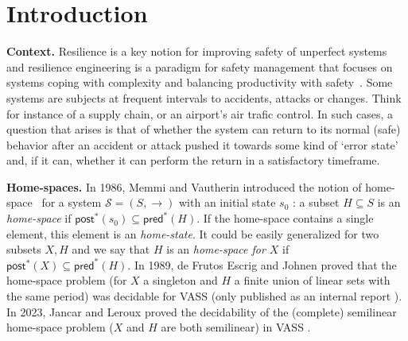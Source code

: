\documentclass[runningheads]{llncs}
\newcommand{\pred}{\textsf{pred}}
\newcommand{\post}{\textsf{post}}
\begin{document}
\newcommand{\LCM}{\mathsf{LCM}}
\newcommand{\LOGSPACE}{\mathsf{LOGSPACE}}
\newcommand{\MSO}{\mathsf{MSO}}
\newcommand{\SO}{\mathsf{SO}}

 \newcommand{\N}{\mathds{N}}



\section{Introduction}\label{section introduction}


{\bf Context.} 
Resilience is a key notion for improving safety of unperfect systems and resilience engineering is a paradigm for safety management that focuses on systems coping with complexity and balancing productivity with safety~\cite{challenges}. Some systems are subjects at frequent intervals to accidents, attacks or changes. Think for instance of a supply chain, or an airport’s air trafic control. In such cases, a question that arises is that of whether the system can return to its normal (safe) behavior after an accident or attack
pushed it towards some kind of ‘error state’ and, if it can, whether it can perform the return in a satisfactory timeframe. 


{\bf Home-spaces.}
 In 1986, Memmi and Vautherin introduced the notion of home-space~\cite{DBLP:conf/ac/MemmiV86} for a system $\mathscr{S} = (S,\rightarrow )$ with an initial state $s_0$ : a subset $H \subseteq S$ is an \emph{home-space}  if 
$\post^*(s_0) \subseteq \pred^*(H)$. If the home-space contains a single element, this element is an {\em home-state}.
It could be easily generalized for two subsets $X,H$ and we say that $H$ is an \emph{home-space for $X$} if $\post^*(X) \subseteq \pred^*(H)$. In 1989, de Frutos Escrig and Johnen proved that the home-space problem (for $X$ a singleton and $H$ a finite union of linear sets with the same period) was decidable for VASS (only published as an internal report \cite{de1989decidability}). In 2023, Jancar and Leroux proved the decidability of the (complete) semilinear home-space problem ($X$ and $H$ are both semilinear)  in VASS \cite{DBLP:journals/corr/abs-2207-02697}.
\end{document}
